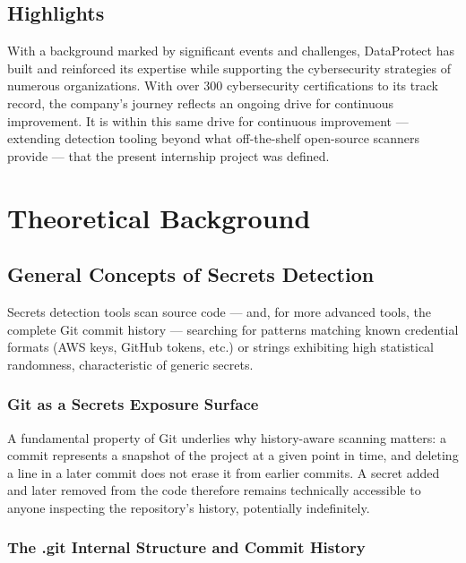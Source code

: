 \documentclass[12pt]{article}
\begin{document}
\subsection{Highlights}

With a background marked by significant events and challenges, DataProtect has
built and reinforced its expertise while supporting the cybersecurity
strategies of numerous organizations. With over 300 cybersecurity
certifications to its track record, the company's journey reflects an ongoing
drive for continuous improvement. It is within this same drive for continuous
improvement --- extending detection tooling beyond what off-the-shelf
open-source scanners provide --- that the present internship project was
defined.

\newpage

\section{Theoretical Background}

\subsection{General Concepts of Secrets Detection}

Secrets detection tools scan source code --- and, for more advanced tools, the complete Git commit history --- searching for patterns matching known credential formats (AWS keys, GitHub tokens, etc.) or strings exhibiting high statistical randomness, characteristic of generic secrets.

\subsubsection{Git as a Secrets Exposure Surface}

A fundamental property of Git underlies why history-aware scanning matters: a commit represents a snapshot of the project at a given point in time, and deleting a line in a later commit does not erase it from earlier commits. A secret added and later removed from the code therefore remains technically accessible to anyone inspecting the repository's history, potentially indefinitely.

\subsubsection{The .git Internal Structure and Commit History}
\end{document}

